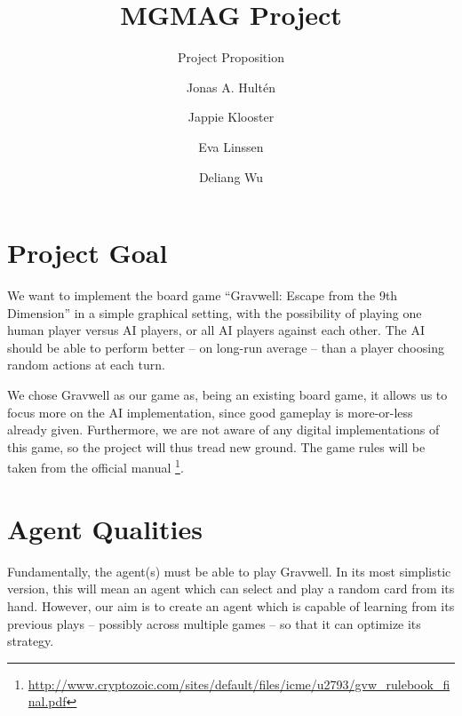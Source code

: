 \documentclass[a4paper]{llncs}
\begin{document}
\title{MGMAG Project}
\subtitle{Project Proposition}
%
%
\author{Jonas A. Hultén \and Jappie Klooster \and Eva Linssen \and Deliang Wu}
%
%

\maketitle              %

\pagestyle{headings}

\section*{Project Goal}

We want to implement the board game ``Gravwell: Escape from the 9th Dimension'' in a simple graphical setting,
with the possibility of playing one human player versus AI players,
or all AI players against each other. The AI should be able to perform
better -- on long-run average -- than a player choosing random actions at
each turn.

We chose Gravwell as our game as, being an existing board game,
it allows us to focus more on the AI implementation,
since good gameplay is more-or-less already given. Furthermore,
we are not aware of any digital implementations of this game, so the
project will thus tread new ground. The game rules will be taken from the
official manual
\footnote{
	\url{http://www.cryptozoic.com/sites/default/files/icme/u2793/gvw_rulebook_final.pdf}
}.

\section*{Agent Qualities}

Fundamentally, the agent(s) must be able to play Gravwell.
In its most simplistic version, this will mean an agent which can select
and play a random card from its hand. However, our aim is to create an
agent which is capable of learning from its previous plays --
possibly across multiple games -- so that it can optimize its strategy.
\end{document}
